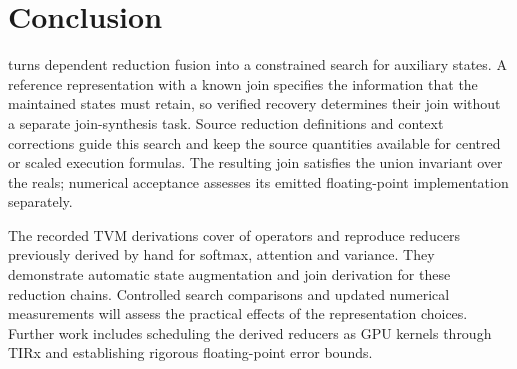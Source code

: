 \section{Conclusion}
\label{sec:conclusion}

\sys turns dependent reduction fusion into a constrained search for auxiliary states.
A reference representation with a known join specifies the information that the maintained states must retain, so verified recovery determines their join without a separate join-synthesis task.
Source reduction definitions and context corrections guide this search and keep the source quantities available for centred or scaled execution formulas.
The resulting join satisfies the union invariant over the reals; numerical acceptance assesses its emitted floating-point implementation separately.

The recorded TVM derivations cover \nShowFused of \nShowcase operators and reproduce reducers previously derived by hand for softmax, attention and variance.
They demonstrate automatic state augmentation and join derivation for these reduction chains.
Controlled search comparisons and updated numerical measurements will assess the practical effects of the representation choices.
Further work includes scheduling the derived reducers as GPU kernels through TIRx and establishing rigorous floating-point error bounds.
